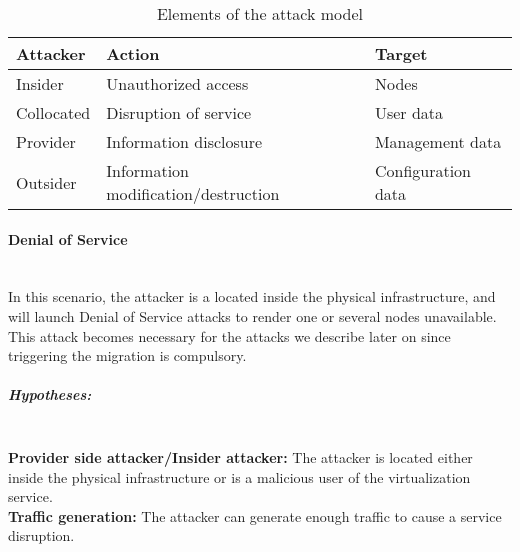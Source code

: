 
\begin{table}[h]
\centering
\begin{tabular}{|l|l|l|}
\hline
\textbf{Attacker}   & \textbf{Action}    & \textbf{Target}             \\ \hline
Insider    & Unauthorized access                  & Nodes              \\ \hline
Collocated & Disruption of service                & User data          \\ \hline
Provider   & Information disclosure               & Management data    \\ \hline
Outsider   & Information modification/destruction & Configuration data \\ \hline
\end{tabular}
\caption{Elements of the attack model}
\label{tab:attack-model}
\end{table}

\paragraph{Denial of Service}\textbf{\\}
In this scenario, the attacker is a located inside the physical infrastructure, and will launch Denial of Service attacks to render one or several nodes unavailable.
This attack becomes necessary for the attacks we describe later on since triggering the migration is compulsory.

\subparagraph{Hypotheses:}\textbf{\\}
\textbf{Provider side attacker/Insider attacker:} The attacker is located either inside the physical infrastructure or is a malicious user of the virtualization service.\\
\textbf{Traffic generation:} The attacker can generate enough traffic to cause a service disruption.

